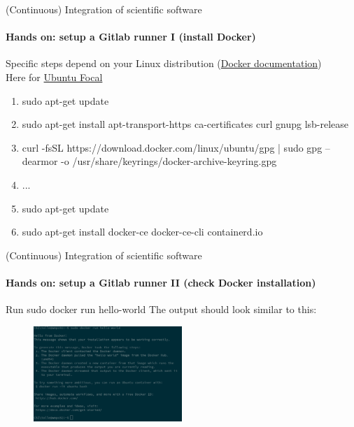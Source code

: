 \begin{frame}{(Continuous) Integration of scientific software}
    \framesubtitle{Hands on: setup a Gitlab runner I (install Docker)}
    Specific steps depend on your Linux distribution (\href{https://docs.docker.com/engine/install/}{Docker documentation})\\
    Here for \href{https://docs.docker.com/engine/install/ubuntu/}{Ubuntu Focal}
    \begin{enumerate}
        \item sudo apt-get update
        \item sudo apt-get install apt-transport-https ca-certificates curl gnupg lsb-release
        \item curl -fsSL https://download.docker.com/linux/ubuntu/gpg | sudo gpg --dearmor -o /usr/share/keyrings/docker-archive-keyring.gpg
        \item ...
        \item sudo apt-get update
        \item sudo apt-get install docker-ce docker-ce-cli containerd.io
    \end{enumerate}
\end{frame}


\begin{frame}{(Continuous) Integration of scientific software}
    \framesubtitle{Hands on: setup a Gitlab runner II (check Docker installation)}
    Run
        sudo docker run hello-world
    The output should look similar to this:
    \begin{figure}
        \includegraphics[width=0.5\textwidth]{figures/docker-installation-success.png}
    \end{figure}
\end{frame}


